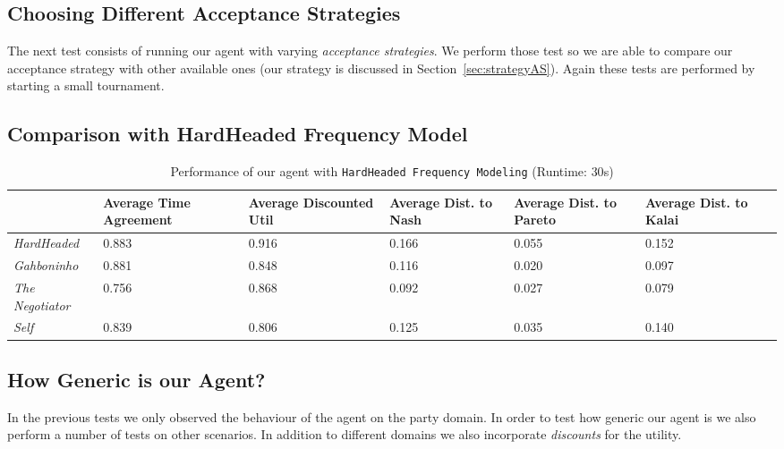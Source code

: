 
\subsection{Choosing Different Acceptance Strategies}

The next test consists of running our agent with varying \emph{acceptance strategies}. We perform those test so we are able to compare our acceptance strategy with other available ones (our strategy is discussed in Section~\ref{sec:strategyAS}). Again these tests are performed by starting a small tournament. \\


\subsection{Comparison with HardHeaded Frequency Model}

\begin{table}
	\centering
	\small
    \begin{tabular}{l|p{2cm}|p{2cm}|p{2cm}|p{2cm}|p{2cm}|p{2cm}|}
    ~              & Average Time Agreement & Average Discounted Util & Average Dist. to Nash & Average Dist. to Pareto & Average Dist. to Kalai \\
    \hline
    \emph{HardHeaded}		& 0.883  & 0.916  & 0.166  & 0.055  & 0.152   \\ \hline
    \emph{Gahboninho}   	& 0.881  & 0.848  & 0.116  & 0.020  & 0.097   \\ \hline
    \emph{The Negotiator} 	& 0.756  & 0.868  & 0.092  & 0.027  & 0.079   \\ \hline
    \emph{Self}             & 0.839  & 0.806  & 0.125  & 0.035  & 0.140   \\ \hline
    \end{tabular}
    \caption{Performance of our agent with \texttt{HardHeaded Frequency Modeling} (Runtime: $30$s) \label{table:anac2011-results}}
\end{table}

\subsection{How Generic is our Agent?}

In the previous tests we only observed the behaviour of the agent on the party domain. In order to test how generic our agent is we also perform a number of tests on other scenarios. In addition to different domains we also incorporate \emph{discounts} for the utility. \\


